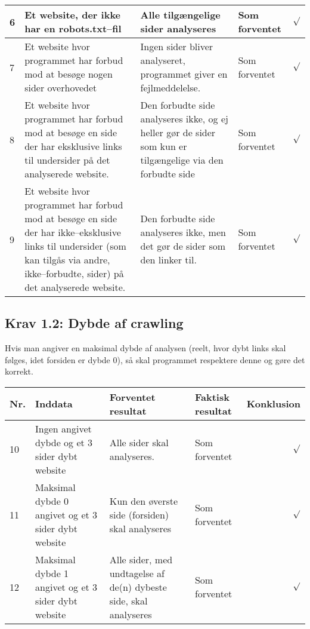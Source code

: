 \documentclass[a4paper,oneside,article]{memoir}
\begin{document}
\begin{landscape}
\begin{longtable}[c]{p{20pt}|p{220pt}|p{130pt}|p{130pt}|r}
6 &
Et website, der ikke har en robots.txt--fil &
Alle tilgængelige sider analyseres &
Som forventet &
$\surd$ \\ \hline

7 &
Et website hvor programmet har forbud mod at besøge nogen sider
overhovedet &
Ingen sider bliver analyseret, programmet giver en fejlmeddelelse. &
Som forventet &
$\surd$ \\ \hline

8 &
Et website hvor programmet har forbud mod at besøge en side der har
eksklusive links til undersider på det analyserede website. &
Den forbudte side analyseres ikke, og ej heller gør de sider som kun
er tilgængelige via den forbudte side &
Som forventet &
$\surd$ \\ \hline

9 &
Et website hvor programmet har forbud mod at besøge en side der har
ikke--eksklusive links til undersider (som kan tilgås via andre,
ikke--forbudte, sider) på det analyserede website. &
Den forbudte side analyseres ikke, men det gør de sider som den linker
til. &
Som forventet &
$\surd$ \\ \hline

\end{longtable}

\subsection{Krav 1.2: Dybde af crawling}
Hvis man angiver en maksimal dybde af analysen (reelt, hvor dybt links
skal følges, idet forsiden er dybde 0), så skal programmet respektere
denne og gøre det korrekt.

\begin{longtable}[c]{p{20pt}|p{220pt}|p{130pt}|p{130pt}|r}
\textbf{Nr.} &
\textbf{Inddata} &
\textbf{Forventet resultat} &
\textbf{Faktisk resultat} &
\textbf{Konklusion} \\ \hline

10 &
Ingen angivet dybde og et 3 sider dybt website &
Alle sider skal analyseres. &
Som forventet &
$\surd$ \\ \hline

11 &
Maksimal dybde 0 angivet og et 3 sider dybt website &
Kun den øverste side (forsiden) skal analyseres &
Som forventet &
$\surd$ \\ \hline

12 &
Maksimal dybde 1 angivet og et 3 sider dybt website &
Alle sider, med undtagelse af de(n) dybeste side, skal analyseres &
Som forventet &
$\surd$ \\ \hline


\end{longtable}
\end{landscape}
\end{document}
